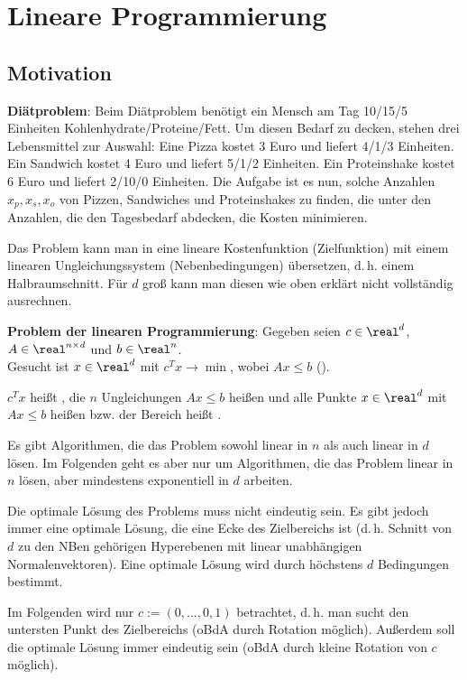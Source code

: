 \chapter{%
    Lineare Programmierung%
}

\section{%
    Motivation%
}

\textbf{Diätproblem}:
Beim Diätproblem benötigt ein Mensch am Tag 10/15/5 Einheiten Kohlenhydrate/Proteine/Fett.
Um diesen Bedarf zu decken, stehen drei Lebensmittel zur Auswahl:
Eine Pizza kostet 3 Euro und liefert 4/1/3 Einheiten.
Ein Sandwich kostet 4 Euro und liefert 5/1/2 Einheiten.
Ein Proteinshake kostet 6 Euro und liefert 2/10/0 Einheiten.
Die Aufgabe ist es nun, solche Anzahlen $x_p, x_s, x_o$ von Pizzen, Sandwiches und Proteinshakes
zu finden, die unter den Anzahlen, die den Tagesbedarf abdecken, die Kosten minimieren.

Das Problem kann man in eine lineare Kostenfunktion (Zielfunktion) mit einem linearen
Ungleichungssystem (Nebenbedingungen) übersetzen,
d.\,h. einem Halbraumschnitt.
Für $d$ groß kann man diesen wie oben erklärt nicht vollständig ausrechnen.

\linie

\textbf{Problem der linearen Programmierung}:
Gegeben seien $c \in \real^d$, $A \in \real^{n \times d}$ und $b \in \real^n$.\\
Gesucht ist $x \in \real^d$ mit $c^T x \to \min$, wobei $Ax \le b$
().

$c^T x$ heißt , die $n$ Ungleichungen $Ax \le b$ heißen
und alle Punkte $x \in \real^d$ mit $Ax \le b$ heißen  bzw.
der Bereich heißt .

Es gibt Algorithmen, die das Problem sowohl linear in $n$ als auch linear in $d$ lösen.
Im Folgenden geht es aber nur um Algorithmen, die das Problem linear in $n$ lösen,
aber mindestens exponentiell in $d$ arbeiten.

Die optimale Lösung des Problems muss nicht eindeutig sein.
Es gibt jedoch immer eine optimale Lösung, die eine Ecke des Zielbereichs ist
(d.\,h. Schnitt von $d$ zu den NBen gehörigen Hyperebenen
mit linear unabhängigen Normalenvektoren).
Eine optimale Lösung wird durch höchstens $d$ Bedingungen bestimmt.

Im Folgenden wird nur $c := (0, \dotsc, 0, 1)$ betrachtet,
d.\,h. man sucht den untersten Punkt des Zielbereichs (oBdA durch Rotation möglich).
Außerdem soll die optimale Lösung immer eindeutig sein
(oBdA durch kleine Rotation von $c$ möglich).

